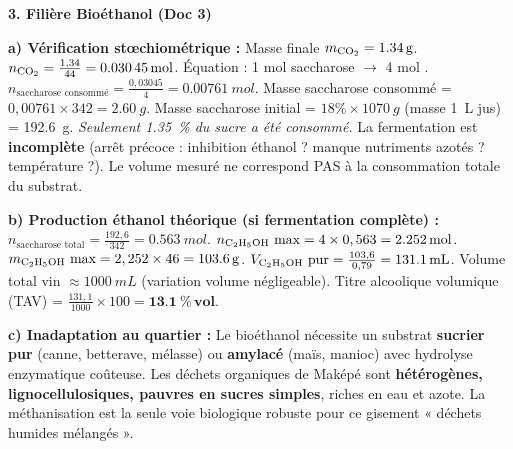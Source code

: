 \documentclass[11pt]{article}
\begin{document}
\begin{exoresolu}
\medskip
\noindent \textbf{3. Filière Bioéthanol (Doc 3)}
\par
\textbf{a) Vérification stœchiométrique :}
Masse  finale $m_{\ce{CO2}} = \SI{1,34}{g}$.
$n_{\ce{CO2}} = \frac{1,34}{44} = \SI{0,03045}{mol}$.
Équation : 1 mol saccharose $\to$ 4 mol .
$n_{\text{saccharose consommé}} = \frac{0,03045}{4} = \SI{0,00761}{mol}$.
Masse saccharose consommé = $0,00761 \times 342 = \SI{2,60}{g}$.
Masse saccharose initial = $18\% \times \SI{1070}{g}$ (masse \SI{1}{L} jus) = \SI{192,6}{g}.
\emph{Seulement \SI{1,35}{\%} du sucre a été consommé.} La fermentation est \textbf{incomplète} (arrêt précoce : inhibition éthanol ? manque nutriments azotés ? température ?). Le volume  mesuré ne correspond PAS à la consommation totale du substrat.
\par
\textbf{b) Production éthanol théorique (si fermentation complète) :}
$n_{\text{saccharose total}} = \frac{192,6}{342} = \SI{0,563}{mol}$.
$n_{\ce{C2H5OH}} \text{ max} = 4 \times 0,563 = \SI{2,252}{mol}$.
$m_{\ce{C2H5OH}} \text{ max} = 2,252 \times 46 = \SI{103,6}{g}$.
$V_{\ce{C2H5OH}} \text{ pur} = \frac{103,6}{0,79} = \mathbf{\SI{131,1}{mL}}$.
Volume total vin $\approx \SI{1000}{mL}$ (variation volume négligeable).
Titre alcoolique volumique (TAV) = $\frac{131,1}{1000} \times 100 = \mathbf{\SI{13,1}{\%\,vol}}$.
\par
\textbf{c) Inadaptation au quartier :}
Le bioéthanol nécessite un substrat \textbf{sucrier pur} (canne, betterave, mélasse) ou \textbf{amylacé} (maïs, manioc) avec hydrolyse enzymatique coûteuse. Les déchets organiques de Maképé sont \textbf{hétérogènes, lignocellulosiques, pauvres en sucres simples}, riches en eau et azote. La méthanisation est la seule voie biologique robuste pour ce gisement « déchets humides mélangés ».


\end{exoresolu}
\end{document}
